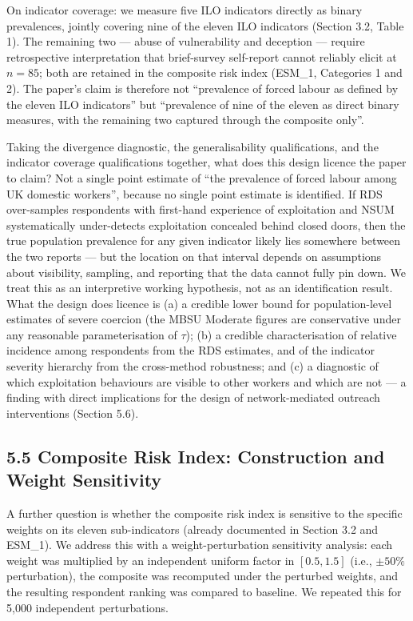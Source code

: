\documentclass[
  12pt,
  letterpaper,
  DIV=11,
  numbers=noendperiod]{scrartcl}
\begin{document}
On indicator coverage: we measure five ILO indicators directly as binary
prevalences, jointly covering nine of the eleven ILO indicators (Section
3.2, Table 1). The remaining two --- abuse of vulnerability and
deception --- require retrospective interpretation that brief-survey
self-report cannot reliably elicit at \(n = 85\); both are retained in
the composite risk index (ESM\_1, Categories 1 and 2). The paper's claim
is therefore not ``prevalence of forced labour as defined by the eleven
ILO indicators'' but ``prevalence of nine of the eleven as direct binary
measures, with the remaining two captured through the composite only''.

Taking the divergence diagnostic, the generalisability qualifications,
and the indicator coverage qualifications together, what does this
design licence the paper to claim? Not a single point estimate of ``the
prevalence of forced labour among UK domestic workers'', because no
single point estimate is identified. If RDS over-samples respondents
with first-hand experience of exploitation and NSUM systematically
under-detects exploitation concealed behind closed doors, then the true
population prevalence for any given indicator likely lies somewhere
between the two reports --- but the location on that interval depends on
assumptions about visibility, sampling, and reporting that the data
cannot fully pin down. We treat this as an interpretive working
hypothesis, not as an identification result. What the design does
licence is (a) a credible lower bound for population-level estimates of
severe coercion (the MBSU Moderate figures are conservative under any
reasonable parameterisation of \(\tau\)); (b) a credible
characterisation of relative incidence among respondents from the RDS
estimates, and of the indicator severity hierarchy from the cross-method
robustness; and (c) a diagnostic of which exploitation behaviours are
visible to other workers and which are not --- a finding with direct
implications for the design of network-mediated outreach interventions
(Section 5.6).

\subsection{5.5 Composite Risk Index: Construction and Weight
Sensitivity}\label{composite-risk-index-construction-and-weight-sensitivity}

A further question is whether the composite risk index is sensitive to
the specific weights on its eleven sub-indicators (already documented in
Section 3.2 and ESM\_1). We address this with a weight-perturbation
sensitivity analysis: each weight was multiplied by an independent
uniform factor in \([0.5, 1.5]\) (i.e., \(\pm 50\%\) perturbation), the
composite was recomputed under the perturbed weights, and the resulting
respondent ranking was compared to baseline. We repeated this for 5,000
independent perturbations.
\end{document}
